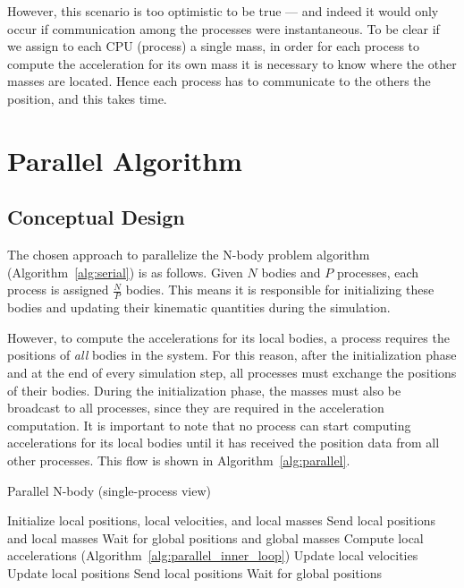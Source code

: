 \documentclass{article}
\begin{document}
However, this scenario is too optimistic to be true — and indeed it would only occur if communication among the processes were instantaneous. To be clear if we assign to each CPU (process) a single mass, in order for each process to compute the acceleration for its own mass it is necessary to know where the other masses are located. Hence each process has to communicate to the others the position, and this takes time.

\section{Parallel Algorithm}
\subsection{Conceptual Design}
The chosen approach to parallelize the N-body problem algorithm (Algorithm~\ref{alg:serial}) is as follows.  
Given $N$ bodies and $P$ processes, each process is assigned $\frac{N}{P}$ bodies.  
This means it is responsible for initializing these bodies and updating their kinematic quantities during the simulation.  

However, to compute the accelerations for its local bodies, a process requires the positions of \emph{all} bodies in the system.  
For this reason, after the initialization phase and at the end of every simulation step, all processes must exchange the positions of their bodies.  
During the initialization phase, the masses must also be broadcast to all processes, since they are required in the acceleration computation.
It is important to note that no process can start computing accelerations for its local bodies until it has received the position data from all other processes.
This flow is shown in Algorithm~\ref{alg:parallel}.

\begin{algorithm}[H]
\caption{Parallel N-body (single-process view)}
\label{alg:parallel}
\begin{algorithmic}[1]
\State Initialize local positions, local velocities, and local masses
\State Send local positions and local masses
\State Wait for global positions and global masses
    \State Compute local accelerations (Algorithm~\ref{alg:parallel_inner_loop})
    \State Update local velocities
    \State Update local positions
    \State Send local positions
    \State Wait for global positions
\EndFor
\end{algorithmic}
\end{algorithm}
\end{document}
